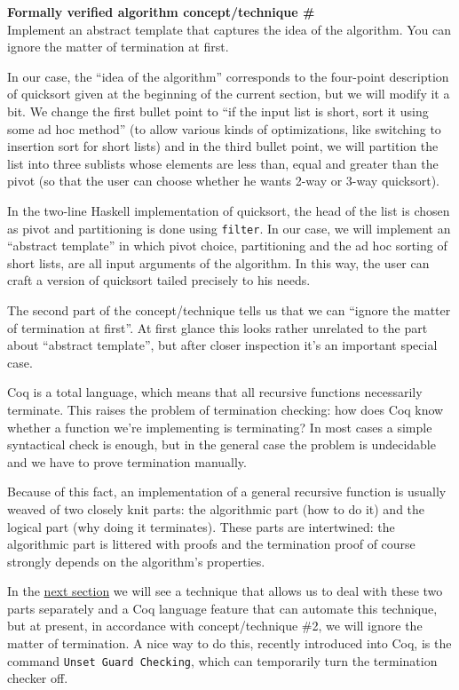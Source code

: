 \documentclass[declaration,mgr,english,shortabstract]{iithesis}
\newcommand{\m}[1]{\texttt{#1}}
\newcounter{cnt}
\newcommand{\runcnt}{\#\arabic{cnt}}
\newcommand{\concept}[1]
{
    \refstepcounter{cnt}
    \begin{center}
        \textbf{Formally verified algorithm concept/technique \runcnt} \\
        #1
    \end{center}
}
\begin{document}
\concept{Implement an abstract template that captures the idea of the algorithm. You can ignore the matter of termination at first.}

In our case, the ``idea of the algorithm'' corresponds to the four-point description of quicksort given at the beginning of the current section, but we will modify it a bit. We change the first bullet point to ``if the input list is short, sort it using some ad hoc method'' (to allow various kinds of optimizations, like switching to insertion sort for short lists) and in the third bullet point, we will partition the list into three sublists whose elements are less than, equal and greater than the pivot (so that the user can choose whether he wants 2-way or 3-way quicksort).

In the two-line Haskell implementation of quicksort, the head of the list is chosen as pivot and partitioning is done using \m{filter}. In our case, we will implement an ``abstract template'' in which pivot choice, partitioning and the ad hoc sorting of short lists, are all input arguments of the algorithm. In this way, the user can craft a version of quicksort tailed precisely to his needs.

The second part of the concept/technique tells us that we can ``ignore the matter of termination at first''. At first glance this looks rather unrelated to the part about ``abstract template'', but after closer inspection it's an important special case.

Coq is a total language, which means that all recursive functions necessarily terminate. This raises the problem of termination checking: how does Coq know whether a function we're implementing is terminating? In most cases a simple syntactical check is enough, but in the general case the problem is undecidable and we have to prove termination manually.

Because of this fact, an implementation of a general recursive function is usually weaved of two closely knit parts: the algorithmic part (how to do it) and the logical part (why doing it terminates). These parts are intertwined: the algorithmic part is littered with proofs and the termination proof of course strongly depends on the algorithm's properties.

In the \hyperref[sanity1]{next section} we will see a technique that allows us to deal with these two parts separately and a Coq language feature that can automate this technique, but at present, in accordance with concept/technique \#2, we will ignore the matter of termination. A nice way to do this, recently introduced into Coq, is the command \m{Unset Guard Checking}, which can temporarily turn the termination checker off.
\end{document}
